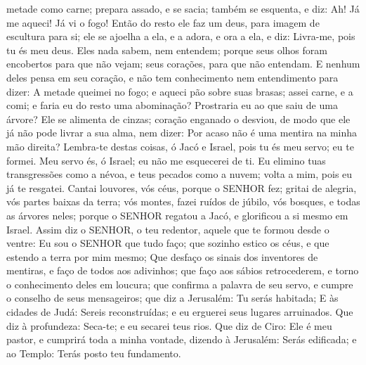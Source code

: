 {{} metade como carne; prepara assado, e
{} se sacia; também se esquenta, e diz: Ah! Já me aqueci! Já vi o fogo!
Então do resto ele faz um deus, para imagem de escultura para si; ele se ajoelha a ela, e a adora, e ora a ela, e diz: Livra-me, pois tu és meu deus.
Eles nada sabem, nem entendem; porque seus olhos foram encobertos para que não vejam;
{} seus corações, para que não entendam.
E nenhum deles pensa
{} em seu coração, e não tem conhecimento nem entendimento para dizer: A metade queimei no fogo; e aqueci pão sobre suas brasas; assei carne, e a comi; e faria eu do resto uma abominação? Prostraria eu ao que saiu de uma árvore?
Ele se alimenta de cinzas;
{} coração enganado o desviou, de modo que ele já não pode livrar a sua alma, nem dizer: Por acaso não é uma mentira
{} na minha mão direita?
Lembra-te destas coisas, ó Jacó e Israel, pois tu és meu servo; eu te formei. Meu servo és, ó Israel; eu não me esquecerei de ti.
Eu elimino tuas transgressões como a névoa, e teus pecados como a nuvem; volta a mim, pois eu já te resgatei.
Cantai louvores, vós céus, porque o SENHOR
{} fez; gritai de alegria, vós partes baixas da terra; vós montes, fazei ruídos de júbilo,
{} vós bosques, e todas as árvores neles; porque o SENHOR regatou a Jacó, e glorificou a si mesmo em Israel.
Assim diz o SENHOR, o teu redentor, aquele que te formou desde o ventre: Eu sou o SENHOR que tudo faço; que sozinho estico os céus, e que estendo a terra por mim mesmo;
Que desfaço os sinais dos inventores de mentiras, e faço de todos aos adivinhos; que faço aos sábios retrocederem, e torno o conhecimento deles em loucura;
 que confirma a palavra de seu servo, e cumpre o conselho de seus mensageiros; que diz a Jerusalém: Tu serás habitada; E às cidades de Judá: Sereis reconstruídas; e eu erguerei seus lugares arruinados.
Que diz à profundeza: Seca-te; e eu secarei teus rios.
Que diz de Ciro: Ele é meu pastor, e cumprirá toda a minha vontade, dizendo à Jerusalém: Serás edificada; e ao Templo: Terás posto teu fundamento.

}
